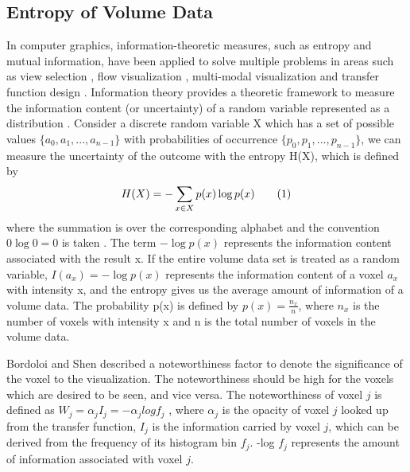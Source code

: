 \subsection{Entropy of Volume Data}
In computer graphics, information-theoretic measures, such as entropy and mutual information, have been applied to solve multiple problems in areas such as view selection \cite{bordoloi_view_2005} 
\cite{bramon_information-theoretic_2013}, flow visualization \cite{xu_information-theoretic_2010}, multi-modal visualization \cite{haidacher_information-based_2008} \cite{bramon_information_2013} and transfer function design \cite{bruckner_isosurface_2010} \cite{ip_hierarchical_2012}.
Information theory provides a theoretic framework to measure the information content (or uncertainty) of a random variable represented as a distribution \cite{wang_information_2011}.
Consider a discrete random variable X which has a set of possible values $\{a_{0},a_{1},...,a_{n-1} \}$ with probabilities of occurrence $\{ p_{0},p_{1},...,p_{n-1} \}$, we can measure the uncertainty of the outcome with the entropy H(X), which is defined by
\[  H(X)=-\sum_{x \in X} p(x) \log p(x) 
\addtag \]
where the summation is over the corresponding alphabet and the convention $ 0\log 0=0 $ is taken%
.
The term $ -\log p(x) $ represents the information content associated with the result x.
If the entire volume data set is treated as a random variable, $ I(a_{x})=-\log p(x) $ represents the information content of a voxel $ a_{x} $ with intensity x, and the entropy gives us the average amount of information of a volume data.
The probability p(x) is defined by
$ p(x)=\frac{n_{x}}{n} $, where $ n_{x} $ is the number of voxels with intensity x and n is the total number of voxels in the volume data.




Bordoloi and Shen \cite{bordoloi_view_2005} described a noteworthiness factor to denote the significance of the voxel to the visualization.
The noteworthiness should be high for the voxels which are desired to be seen, and vice versa. The noteworthiness of voxel $ j $ is defined as
$ W_{j}=\alpha_{j}I_{j}=-\alpha_{j}logf_{j} $
, where $ \alpha_{j} $ is the opacity of voxel $ j $ looked up from the transfer function, $ I_{j} $ is the information carried by voxel $ j $, which can be derived from the frequency of its histogram bin $ f_{j} $. -log $ f_{j} $ represents the amount of information associated with voxel $ j $.

